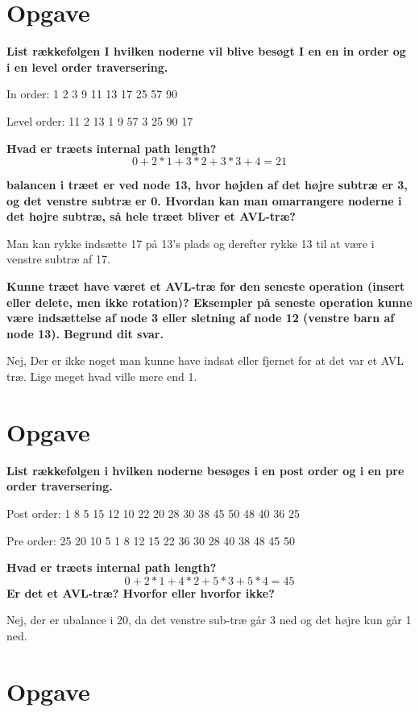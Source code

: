 \documentclass{article}
\begin{document}
\section{Opgave} %
\textbf{List rækkefølgen I hvilken noderne vil blive besøgt I en en in order og i en level order traversering.}

In order: 1 2 3 9 11 13 17 25 57 90

Level order: 11 2 13 1 9 57 3 25 90 17

\textbf{Hvad er træets internal path length?}  
$$0 + 2 * 1 + 3 * 2 + 3 * 3 + 4 = 21$$

\textbf{balancen i træet er ved node 13, hvor højden af det højre subtræ er 3, og det venstre subtræ er 0.
Hvordan kan man omarrangere noderne i det højre subtræ, så hele træet bliver et AVL-træ?}

Man kan rykke indsætte 17 på 13's plads og derefter rykke 13 til at være i venstre subtræ af 17.
 
\textbf{Kunne træet have været et AVL-træ før den seneste operation (insert eller delete, men ikke rotation)? 
Eksempler på seneste operation kunne være indsættelse af node 3 eller sletning af node 12 (venstre barn af 
node 13). Begrund dit svar.}

Nej, Der er ikke noget man kunne have indsat eller fjernet for at det var et AVL træ. Lige meget hvad ville mere end 1.

\section{Opgave} %
\textbf{List rækkefølgen i hvilken noderne besøges i en post order og i en pre order traversering.}

Post order: 1 8 5 15 12 10 22 20 28 30 38 45 50 48 40 36 25

Pre order: 25 20 10 5 1 8 12 15 22 36 30 28 40 38 48 45 50

\textbf{Hvad er træets internal path length?}
$$0 + 2 * 1 + 4 * 2 + 5 * 3 + 5 * 4 = 45$$
\textbf{Er det et AVL-træ? Hvorfor eller hvorfor ikke?}

Nej, der er ubalance i 20, da det venstre sub-træ går 3 ned og det højre kun går 1 ned.

\section{Opgave} %
\end{document}
